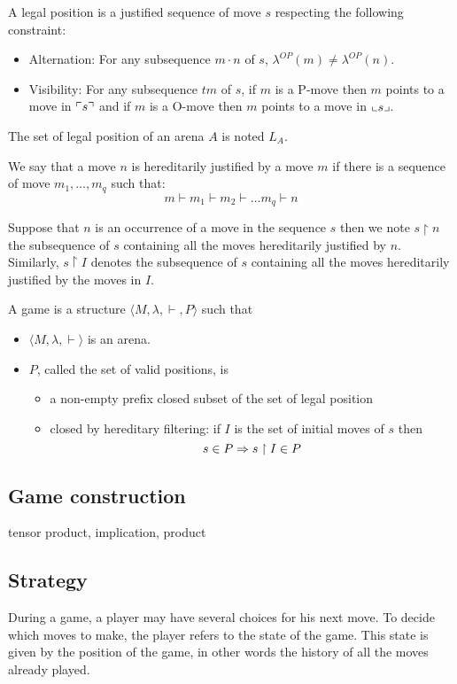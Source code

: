\begin{dfn}
A legal position is a justified sequence of move $s$ respecting the following constraint:
\begin{itemize}
\item Alternation: For any subsequence $m \cdot n$ of $s$, $\lambda^{OP}(m) \neq \lambda^{OP}(n)$.
\item Visibility: For any subsequence $t m$ of $s$, if $m$ is a P-move then $m$ points to a move in $\ulcorner s \urcorner$
and if $m$ is a O-move then $m$ points to a move in $\llcorner s \lrcorner$.
\end{itemize}

The set of legal position of an arena $A$ is noted $L_A$.
\end{dfn}

We say that a move $n$ is hereditarily justified by a move $m$ if there is a sequence of move
$m_1, \ldots, m_q$ such that:
$$ m \vdash m_1 \vdash m_2 \vdash \ldots m_q \vdash n$$

Suppose that $n$ is an occurrence of a move in the sequence $s$ then we note
$s \upharpoonright n$ the subsequence of $s$ containing all the moves hereditarily justified by $n$.
Similarly, $s \upharpoonright I$ denotes the
subsequence of $s$ containing all the moves hereditarily justified by the moves in $I$.

\begin{dfn}[Game]
A game is a structure $\langle M, \lambda, \vdash, P \rangle$ such that
\begin{itemize}
\item $ \langle M, \lambda, \vdash \rangle$ is an arena.
\item $P$, called the set of valid positions, is
    \begin{itemize}
    \item a non-empty prefix closed subset of the set of legal position
    \item closed by hereditary filtering: if $I$ is the set of initial moves of $s$ then
        $$ s \in P \Rightarrow s\upharpoonright I \in P$$
    \end{itemize}
\end{itemize}
\end{dfn}

\subsection{Game construction}
tensor product, implication, product

\subsection{Strategy}
During a game, a player may have several choices for his next move.
To decide which moves to make, the player refers to the state of the game.
This state is given by the position of the game, in other words
the history of all the moves already played.

